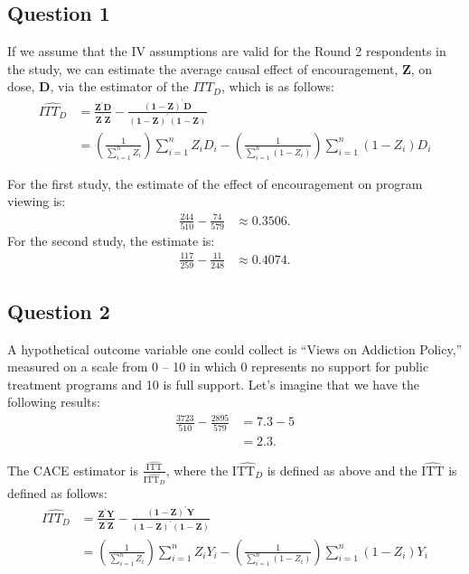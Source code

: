 \documentclass[11pt]{article}\usepackage[]{graphicx}\usepackage[]{color}
\theoremstyle{newstyle}
\begin{document}
\subsection{Question 1}

If we assume that the IV assumptions are valid for the Round 2 respondents in the \citet{albertsonlawrence2009} study, we can estimate the average causal effect of encouragement, $\mathbf{Z}$, on dose, $\mathbf{D}$, via the estimator of the $ITT_D$, which is as follows:
\begin{align*}
\widehat{ITT_D} & = \frac{\mathbf{Z}^{\prime}\mathbf{D}}{\mathbf{Z}^{\prime}\mathbf{Z}} - \frac{\left(\mathbf{1} - \mathbf{Z}\right)^{\prime}\mathbf{D}}{\left(\mathbf{1} - \mathbf{Z}\right)^{\prime}\left(\mathbf{1} - \mathbf{Z}\right)} \\ 
& = \left(\frac{1}{\sum_{i = 1}^n Z_i}\right) \sum_{i = 1}^n Z_i D_i - \left(\frac{1}{\sum_{i = 1}^n \left(1 - Z_i\right)}\right) \sum_{i = 1}^n \left(1 - Z_i\right) D_i
\end{align*}

For the first study, the estimate of the effect of encouragement on program viewing is:
\begin{align*}
\frac{244}{510} - \frac{74}{579} & \approx 0.3506.
\end{align*}
For the second study, the estimate is:
\begin{align*}
\frac{117}{259} - \frac{11}{248} & \approx 0.4074.
\end{align*}

\subsection{Question 2}

A hypothetical outcome variable one could collect is ``Views on Addiction Policy,'' measured on a scale from 0 -- 10 in which 0 represents no support for public treatment programs and 10 is full support. Let's imagine that we have the following results:
\begin{align*}
\frac{3723}{510} - \frac{2895}{579} & = 7.3 - 5 \\
& = 2.3.
\end{align*}

The CACE estimator is $\frac{\widehat{\text{ITT}}}{\widehat{\text{ITT}_D}}$, where the $\widehat{\text{ITT}_D}$ is defined as above and the $\widehat{\text{ITT}}$ is defined as follows:
\begin{align*}
\widehat{ITT_D} & = \frac{\mathbf{Z}^{\prime}\mathbf{Y}}{\mathbf{Z}^{\prime}\mathbf{Z}} - \frac{\left(\mathbf{1} - \mathbf{Z}\right)^{\prime}\mathbf{Y}}{\left(\mathbf{1} - \mathbf{Z}\right)^{\prime}\left(\mathbf{1} - \mathbf{Z}\right)} \\ 
& = \left(\frac{1}{\sum_{i = 1}^n Z_i}\right) \sum_{i = 1}^n Z_i Y_i - \left(\frac{1}{\sum_{i = 1}^n \left(1 - Z_i\right)}\right) \sum_{i = 1}^n \left(1 - Z_i\right) Y_i
\end{align*}
\end{document}
